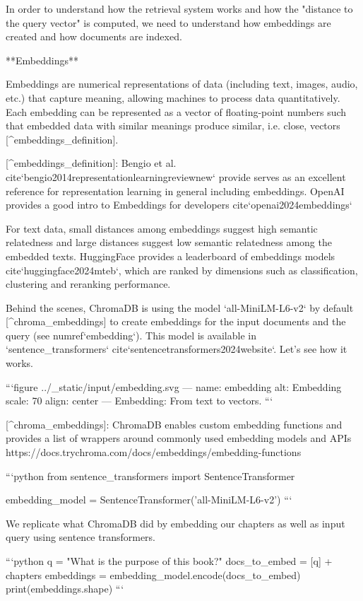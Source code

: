 {{In order to understand how the retrieval system works and how the "distance to the query vector" is computed, we need to understand how embeddings are created and how documents are indexed.

**Embeddings**

Embeddings are numerical representations of data (including text, images, audio, etc.) that capture meaning, allowing machines to process data quantitatively. Each embedding can be represented as a vector of floating-point numbers such that embedded data with similar meanings produce similar, i.e. close, vectors [^embeddings_definition].

[^embeddings_definition]: Bengio et al. {cite}`bengio2014representationlearningreviewnew` provide serves as an excellent reference for representation learning in general including embeddings. OpenAI provides a good intro to Embeddings for developers {cite}`openai2024embeddings`

For text data, small distances among embeddings suggest high semantic relatedness and large distances suggest low semantic relatedness among the embedded texts. HuggingFace provides a leaderboard of embeddings models {cite}`huggingface2024mteb`, which are ranked by dimensions such as classification, clustering and reranking performance.

Behind the scenes, ChromaDB is using the model `all-MiniLM-L6-v2` by default [^chroma_embeddings] to create embeddings for the input documents and the query (see {numref}`embedding`). This model is available in `sentence_transformers` {cite}`sentencetransformers2024website`. Let's see how it works.

```{figure} ../_static/input/embedding.svg
---
name: embedding
alt: Embedding
scale: 70%
align: center
---
Embedding: From text to vectors.
```

[^chroma_embeddings]: ChromaDB enables custom embedding functions and provides a list of wrappers around commonly used embedding models and APIs https://docs.trychroma.com/docs/embeddings/embedding-functions


```python
from sentence_transformers import SentenceTransformer

embedding_model = SentenceTransformer('all-MiniLM-L6-v2')
```

We replicate what ChromaDB did by embedding our chapters as well as input query using sentence transformers.


```python
q = "What is the purpose of this book?"
docs_to_embed = [q] + chapters
embeddings = embedding_model.encode(docs_to_embed)
print(embeddings.shape)
```

}}
